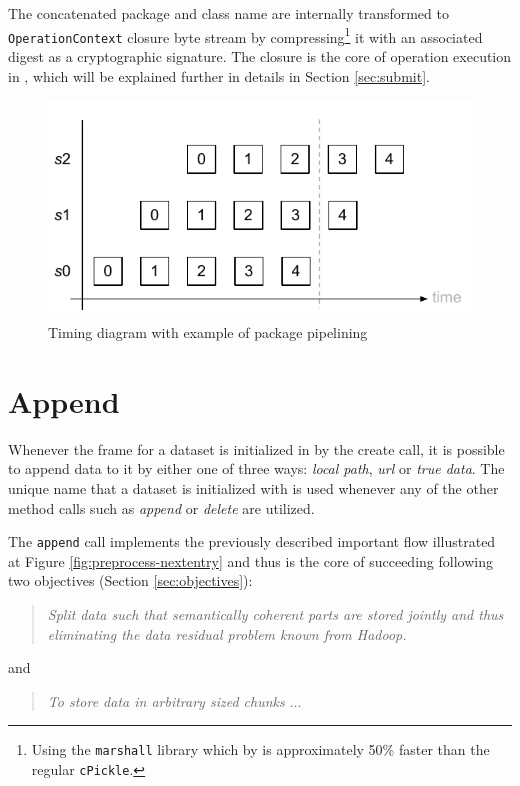 The concatenated package and class name are internally transformed to \CodeName \texttt{OperationContext} closure byte stream by compressing\footnote{Using the \texttt{marshall} \cite{PageMarshall} library which by \cite{Brody2015} is approximately 50\% faster than the regular \texttt{cPickle}.} it with an associated digest as a cryptographic signature. The closure is the core of operation execution in \CodeName, which will be explained further in details in Section \ref{sec:submit}.

\begin{figure}[ht!]
	\vspace*{5mm}
	\centering
	\includegraphics[scale=1.3]{pdf/package-pipeline.pdf}
	\caption{Timing diagram with example of package pipelining \label{fig:package-pipeline}}
\end{figure}	

\section{Append} \label{sec:api-append}
Whenever the frame for a dataset is initialized in \CodeName by the create call, it is possible to append data to it by either one of three ways: \textit{local path}, \textit{url} or \textit{true data}. The unique name that a dataset is initialized with is used whenever any of the other method calls such as \textit{append} or \textit{delete} are utilized. 
\newline

The \texttt{append} call implements the previously described important flow illustrated at Figure \ref{fig:preprocess-nextentry} and thus is the core of succeeding following two objectives (Section \ref{sec:objectives}):

\begin{quotation}
	\textit{Split data such that semantically coherent parts are stored jointly and thus eliminating the data residual problem known from Hadoop.}
\end{quotation}
\noindent
and
\begin{quotation}
	\textit{To store data in arbitrary sized chunks $\ldots$}
\end{quotation}

